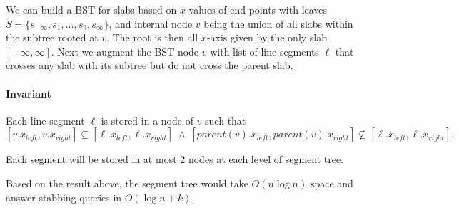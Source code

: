 We can build a BST for slabs based on $x$-values of end points with leaves $S = \{s_{-\infty},s_1, \dots, s_9, s_{\infty} \}$, and internal node $v$ being the union of all slabs within the subtree rooted at $v$. 
%
The root is then all $x$-axis given by the only slab $[-\infty, \infty]$.
%
Next we augment the BST node $v$ with list of line segments $\ell$ that crosses any slab with its subtree but do not cross the parent slab. 
%
\paragraph{Invariant} Each line segment $\ell$ is stored in a node of $v$ such that 
\[ [v.x_{left}, v.x_{right}] \subseteq [ \ell.x_{left}, \ell.x_{right}]   \; \wedge \; [parent(v).x_{left}, parent(v).x_{right}] \not \subseteq [\ell.x_{left}, \ell.x_{right}].   \]

\begin{claim}
Each segment will be stored in at most 2 nodes at each level of segment tree.
\end{claim} 

Based on the result above, the segment tree would take $O(n \log n)$ space and answer stabbing queries in $O(\log n + k)$.